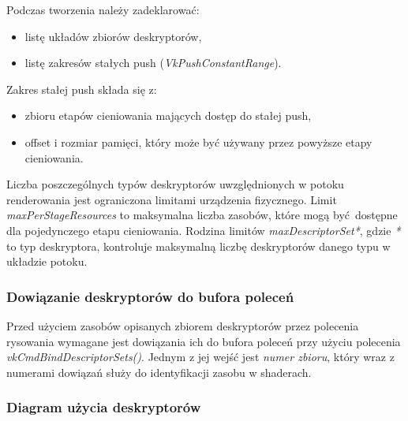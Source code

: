 Podczas tworzenia należy zadeklarować:
\begin{itemize}
	\item listę układów zbiorów deskryptorów,
	\item listę zakresów stałych push (\textit{VkPushConstantRange}).
\end{itemize}

Zakres stałej push składa się z:
\begin{itemize}
	\item zbioru etapów cieniowania mających dostęp do stałej push,
	\item offset i rozmiar pamięci, który może być używany przez powyższe etapy cieniowania.
\end{itemize}

Liczba poszczególnych typów deskryptorów uwzględnionych w potoku renderowania jest ograniczona limitami urządzenia fizycznego.
Limit \textit{maxPerStageResources} to maksymalna liczba zasobów, które mogą być dostępne dla pojedynczego etapu cieniowania.
Rodzina limitów \textit{maxDescriptorSet*}, gdzie \textit{*} to typ deskryptora, kontroluje maksymalną liczbę deskryptorów danego typu w układzie potoku.

\subsubsection{Dowiązanie deskryptorów do bufora poleceń}

Przed użyciem zasobów opisanych zbiorem deskryptorów przez polecenia rysowania wymagane jest dowiązania ich do bufora
poleceń przy użyciu polecenia \textit{vkCmdBindDescriptorSets()}. Jednym z jej wejść jest \textit{numer zbioru}, który wraz z numerami
dowiązań służy do identyfikacji zasobu w shaderach.


\subsubsection{Diagram użycia deskryptorów}

